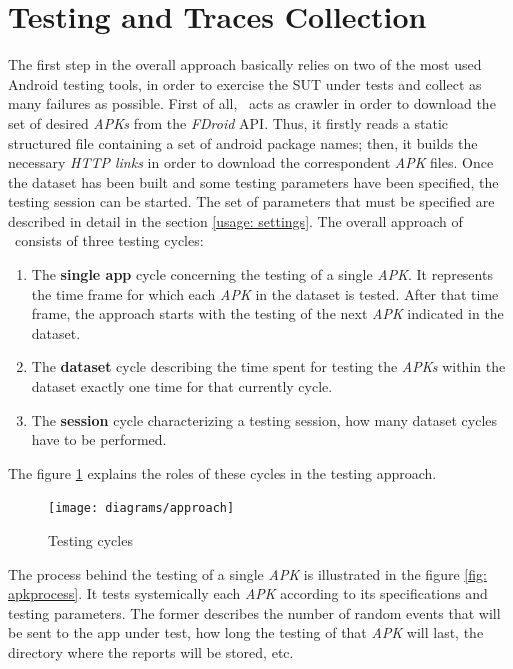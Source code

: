 \section{Testing and Traces Collection}
\label{approach:testing}
The first step in the overall approach basically relies on two of the most used Android testing tools, in order to exercise the SUT under tests and collect as many failures as possible. 
First of all, \toolname\ acts as crawler in order to download the set of desired \textit{APKs} from the \textit{FDroid} API. 
Thus, it firstly reads a static structured file containing a set of android package names; then, it builds the necessary \textit{HTTP links} in order to download the correspondent \textit{APK} files. 
Once the dataset has been built and some testing parameters have been specified, the testing session can be started. 
The set of parameters that must be specified are described in detail in the section \ref{usage: settings}.
The overall approach of \toolname\ consists of three testing cycles: 
\begin{enumerate}
\item The \textbf{single app} cycle concerning the testing of a single \textit{APK}. It represents the time frame for which each \textit{APK} in the dataset is tested. After that time frame, the approach starts with the testing of the next \textit{APK} indicated in the dataset. 
\item The \textbf{dataset} cycle describing the time spent for testing the \textit{APKs} within the dataset exactly one time for that currently cycle. 
\item The \textbf{session} cycle characterizing a testing session, \ie how many dataset cycles have to be performed. 
\end{enumerate}
The figure \ref{fig: testingapproach} explains the roles of these cycles in the testing approach. 
\begin{figure}[tb]
\centering 
\texttt{[image: diagrams/approach]} 
\caption{Testing cycles}
\label{fig: testingapproach}
\end{figure}
The process behind the testing of a single \textit{APK} is illustrated in the figure \ref{fig: apkprocess}.
It tests systemically each \textit{APK} according to its specifications and testing parameters. The former describes the number of random events that will be sent to the app under test, how long the testing of that \textit{APK} will last, the directory where the reports will be stored, etc. 

